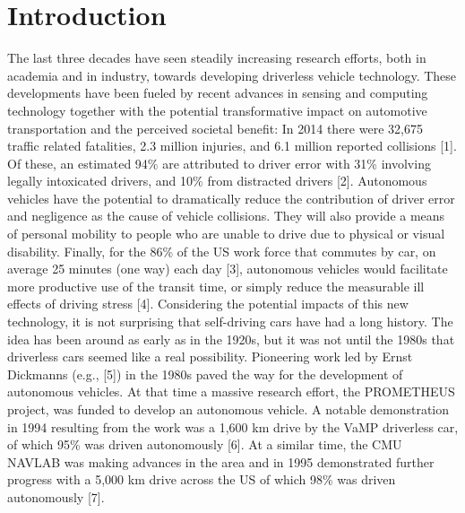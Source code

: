 \section{Introduction}
The last three decades have seen steadily increasing research efforts, both in academia and in industry, towards developing driverless vehicle technology. These developments have been fueled by recent advances in sensing and computing technology together with the potential transformative impact on automotive transportation and the perceived societal benefit: In 2014 there were 32,675 traffic related fatalities, 2.3 million injuries, and 6.1 million reported collisions [1]. Of these, an estimated 94\% are attributed to driver error with 31\% involving legally intoxicated drivers, and 10\% from distracted drivers [2]. Autonomous vehicles have the potential to dramatically reduce the contribution of driver error and negligence as the cause of vehicle collisions. They will also provide a means of personal mobility to people who are unable to drive due to physical or visual disability. Finally, for the 86\% of the US work force that commutes by car, on average 25 minutes (one way) each day [3], autonomous vehicles would facilitate more productive use of the transit time, or simply reduce the measurable ill effects of driving stress [4]. Considering the potential impacts of this new technology, it is not surprising that self-driving cars have had a long history. The idea has been around as early as in the 1920s, but it was not until the 1980s that driverless cars seemed like a real possibility. Pioneering work led by Ernst Dickmanns (e.g., [5]) in the 1980s paved the way for the development of autonomous vehicles. At that time a massive research effort, the PROMETHEUS project, was funded to develop an autonomous vehicle. A notable demonstration in 1994 resulting from the work was a 1,600 km drive by the VaMP driverless car, of which 95\% was driven autonomously [6]. At a similar time, the CMU NAVLAB was making advances in the area and in 1995 demonstrated further progress with a 5,000 km drive across the US of which 98\% was driven autonomously [7].

